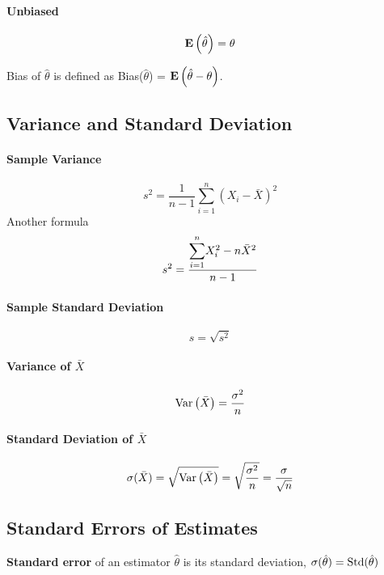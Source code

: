 \paragraph{Unbiased}
\begin{equation*}
    \mathbf{E}\left(\hat{\theta}\right) = \theta
\end{equation*}

Bias of $\hat{\theta}$ is defined as Bias($\hat{\theta}$) = $\mathbf{E}\left(\hat{\theta} - \theta\right)$.

\subsection{Variance and Standard Deviation}

\paragraph{Sample Variance}
\begin{equation*}
    s^2 = \frac{1}{n - 1} \sum_{i = 1}^{n} (X_i - \bar{X})^2
\end{equation*}
Another formula
\begin{equation*}
    s^2 = \frac{\dsum_{i=1}^n X_i^2 - n\bar{X}^2}{n-1}
\end{equation*}

\paragraph{Sample Standard Deviation}
\begin{equation*}
    s = \sqrt{s^2}
\end{equation*}

\paragraph{Variance of $\bar{X}$}
\begin{equation*}
    \text{Var}\left( \bar{X} \right) = \frac{\sigma^2}{n}
\end{equation*}

\paragraph{Standard Deviation of $\bar{X}$}
\begin{equation*}
    \sigma(\bar{X}) = \sqrt{\text{Var}\left( \bar{X} \right)} = \sqrt{\frac{\sigma^2}{n}} = \frac{\sigma}{\sqrt{n}}
\end{equation*}

\subsection{Standard Errors of Estimates}

\textbf{Standard error} of an estimator $\hat{\theta}$ is its standard deviation, $\sigma(\hat{\theta}) = \textnormal{Std}(\hat{\theta})$
